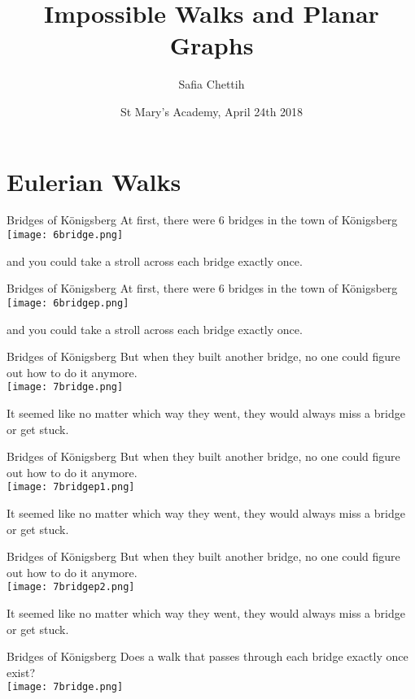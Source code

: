 \documentclass{beamer}
\title{Impossible Walks and Planar Graphs}
\author
{Safia Chettih}
\institute{Reed College} %
\date[ATS] 
{St Mary's Academy, April 24th 2018}
\begin{document}
\begin{frame}
\titlepage
\end{frame}

\section{Eulerian Walks}

\begin{frame}{Bridges of Königsberg}
\centering
At first, there were 6 bridges in the town of Königsberg\\
\texttt{[image: 6bridge.png]}

and you could take a stroll across each bridge exactly once.
\end{frame}
\begin{frame}{Bridges of Königsberg}
\centering
At first, there were 6 bridges in the town of Königsberg\\
\texttt{[image: 6bridgep.png]}

and you could take a stroll across each bridge exactly once.
\end{frame}
\begin{frame}{Bridges of Königsberg}
\centering
But when they built another bridge, no one could figure out how to do it anymore.\\
\texttt{[image: 7bridge.png]}

It seemed like no matter which way they went, they would always miss a bridge or get stuck.
\end{frame}
\begin{frame}{Bridges of Königsberg}
\centering
But when they built another bridge, no one could figure out how to do it anymore.\\
\texttt{[image: 7bridgep1.png]}

It seemed like no matter which way they went, they would always miss a bridge or get stuck.
\end{frame}\begin{frame}{Bridges of Königsberg}
\centering
But when they built another bridge, no one could figure out how to do it anymore.\\
\texttt{[image: 7bridgep2.png]}

It seemed like no matter which way they went, they would always miss a bridge or get stuck.
\end{frame}
\begin{frame}{Bridges of Königsberg}
\centering
Does a walk that passes through each bridge exactly once exist?\\
\texttt{[image: 7bridge.png]}
\end{frame}
\end{document}
